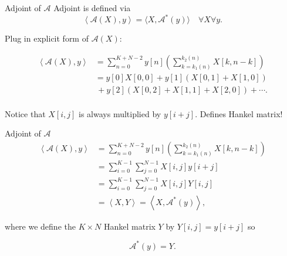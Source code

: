 \documentclass[xcolor=dvipsnames,t]{beamer} %
\begin{document}
\begin{frame}{Adjoint of $\mathcal{A}$}
   Adjoint is defined via
   \[ \left\langle \mathcal{A}(X), y \right\rangle = \langle X,\mathcal{A}^\ast(y)\rangle \quad \forall X \forall y. \] 
   
   Plug in explicit form of $\mathcal{A}(X)$:

   \begin{align*}
   \left\langle \mathcal{A}(X),y\right\rangle &= \sum_{n=0}^{K+N-2}y[n] \left(\sum_{k=k_1(n)}^{k_2(n)} X[k,n-k]\right)\\
                                              &= y[0]X[0,0] + y[1]\left(X[0,1]+X[1,0]\right)\\
                                              &\,+ y[2]\left(X[0,2] + X[1,1] + X[2,0]\right) + \cdots.\\
   \end{align*}

   Notice that $X[i,j]$ is always multiplied by $y[i+j]$.  Defines Hankel matrix!

\end{frame}

\begin{frame}{Adjoint of $\mathcal{A}$}
   \begin{align*}
      \left\langle \mathcal{A}(X),y\right\rangle &= \sum_{n=0}^{K+N-2}y[n] \left(\sum_{k=k_1(n)}^{k_2(n)} X[k,n-k]\right)\\
                                                 &= \sum_{i=0}^{K-1}\sum_{j=0}^{N-1} X[i,j]y[i+j]\\
                                                 &= \sum_{i=0}^{K-1}\sum_{j=0}^{N-1} X[i,j]Y[i,j]\\
                                                 &= \left\langle X, Y\right\rangle = \left\langle X, \mathcal{A}^\ast(y)\right\rangle,
   \end{align*}

   where we define the $K\times N$ Hankel matrix $Y$ by $Y[i,j] = y[i+j]$ so

   \[ \mathcal{A}^\ast(y) = Y. \] 

\end{frame}
\end{document}

